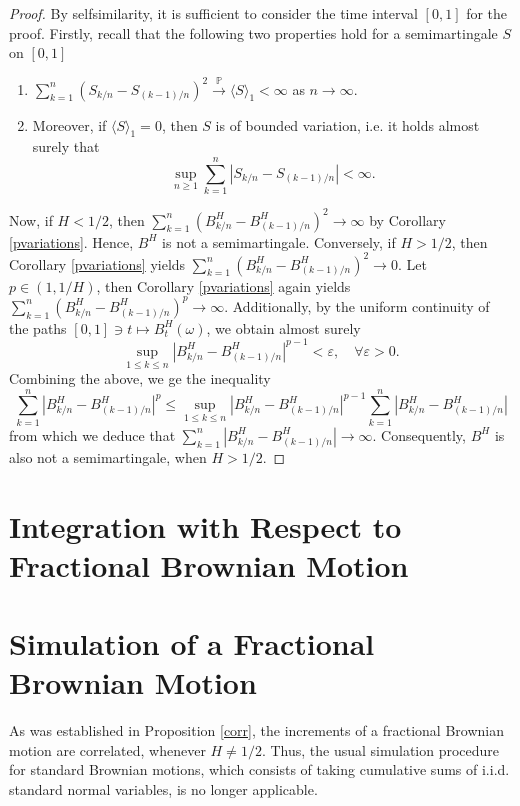 \begin{proof}
    By selfsimilarity, it is sufficient to consider the time interval $[0,1]$ for the proof. Firstly, recall that the following two properties hold for a semimartingale $S$ on $[0,1]$
    \begin{enumerate}
        \item $\sum_{k=1}^{n}\left(S_{k/n}-S_{(k-1)/n}\right)^{2}\overset{\mathbb{P}}{\to} \langle S\rangle_{1}<\infty$ as $n\to\infty$.
        \item Moreover, if $\langle S\rangle_{1}=0$, then $S$ is of bounded variation, i.e. it holds almost surely that
        \begin{equation}
            \sup_{n\geq 1}\sum_{k=1}^{n}|S_{k/n}-S_{(k-1)/n}|<\infty. 
        \end{equation}
    \end{enumerate}
    Now, if $H<1/2$, then $\sum_{k=1}^{n}(B_{k/n}^{H}-B_{(k-1)/n}^{H})^{2}\to \infty$ by Corollary \ref{pvariations}. Hence, $B^H$ is not a semimartingale. Conversely, if $H>1/2$, then Corollary \ref{pvariations} yields $\sum_{k=1}^{n}(B_{k/n}^{H}-B_{(k-1)/n}^{H})^{2}\to 0$. Let $p\in (1,1/H)$, then Corollary \ref{pvariations} again yields $\sum_{k=1}^{n}(B_{k/n}^{H}-B_{(k-1)/n}^{H})^{p}\to \infty$. Additionally, by the uniform continuity of the paths $[0,1]\ni t\mapsto B_{t}^{H}(\omega)$, we obtain almost surely
    \begin{equation}
        \sup_{1\leq k\leq n}|B_{k/n}^{H}-B_{(k-1)/n}^{H}|^{p-1}<\varepsilon, \quad \forall \varepsilon>0.
    \end{equation}
    Combining the above, we ge the inequality
    \begin{equation}
        \sum_{k=1}^{n}\left|B_{k/n}^{H}-B_{(k-1)/n}^{H}\right|^{p}\leq \sup_{1\leq k\leq n}|B_{k/n}^{H}-B_{(k-1)/n}^{H}|^{p-1}\sum_{k=1}^{n}\left|B_{k/n}^{H}-B_{(k-1)/n}^{H}\right|
    \end{equation}
    from which we deduce that $\sum_{k=1}^{n}|B_{k/n}^{H}-B_{(k-1)/n}^{H}|\to \infty$. Consequently, $B^H$ is also not a semimartingale, when $H>1/2$.
\end{proof}
\section{Integration with Respect to Fractional Brownian Motion}
\section{Simulation of a Fractional Brownian Motion}
As was established in Proposition \ref{corr}, the increments of a fractional Brownian motion are correlated, whenever $H\neq 1/2$. Thus, the usual simulation procedure for standard Brownian motions, which consists of taking cumulative sums of i.i.d. standard normal variables, is no longer applicable. 

